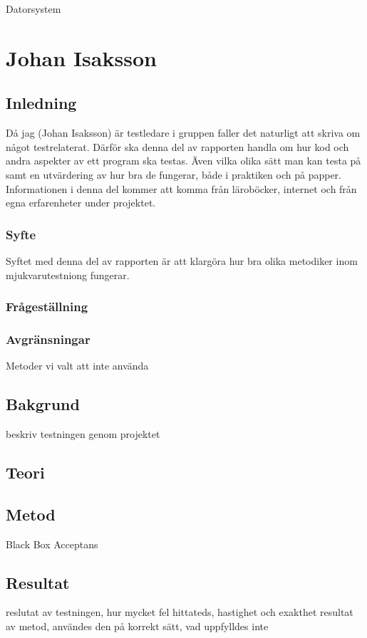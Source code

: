 Datorsystem\section{Johan Isaksson}
	\subsection{Inledning}
	Då jag (Johan Isaksson) är testledare i gruppen faller det naturligt att skriva om något testrelaterat. Därför ska denna del av rapporten handla om hur kod och andra aspekter av ett program ska testas. Även vilka olika sätt man kan testa på samt en utvärdering av hur bra de fungerar, både i praktiken och på papper. Informationen i denna del kommer att komma från läroböcker, internet och från egna erfarenheter under projektet. 
	
	
	\subsubsection{Syfte}
	Syftet med denna del av rapporten är att klargöra hur bra olika metodiker inom mjukvarutestniong fungerar.
	
	
	\subsubsection{Frågeställning}
	
	\subsubsection{Avgränsningar}
	Metoder vi valt att inte använda
	
	
	\subsection{Bakgrund}
	beskriv testningen genom projektet
	
	
	\subsection{Teori}
	
	\subsection{Metod}
	Black Box
	Acceptans
	
	
	\subsection{Resultat}
	reslutat av testningen, hur mycket fel hittateds, hastighet och exakthet
	resultat av metod, användes den på korrekt sätt, vad uppfylldes inte
	
